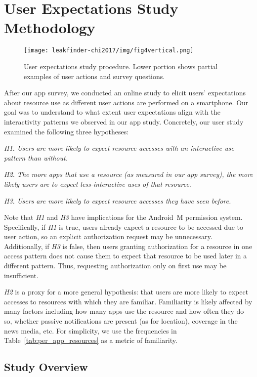 \section{User Expectations Study Methodology}

\begin{figure}[t]
\centering \texttt{[image: leakfinder-chi2017/img/fig4vertical.png]}
\caption{User expectations study procedure. Lower 
portion shows partial examples of user actions and survey questions.}
\label{fig:survey-example}
\end{figure}

After our app survey, we conducted an online study to elicit
users' expectations about resource use as different user actions are
performed on a smartphone.
 Our goal was to understand to what extent user
expectations align with the interactivity patterns we
observed in our app study. Concretely, our user study examined the following three
hypotheses:

\emph{H1. Users are more likely to expect resource accesses with an
  interactive use pattern than without.}

\emph{H2. The more apps that use a resource (as measured in our app survey), the more 
likely users are to expect less-interactive uses of that resource.}

\emph{H3. Users are more likely to expect resource accesses they
  have seen before.}

Note that \textit{H1} and \textit{H3} have implications for the Android~M
permission system. Specifically, if \emph{H1} is true, users already
expect a resource to be accessed due to user action, so an
explicit authorization request may be unnecessary. Additionally, if
\emph{H3} is false, then users granting authorization for a resource
in one access pattern does not cause them to expect that resource to
be used later in a different pattern. Thus, requesting authorization
only on first use may be insufficient.

\textit{H2} is a proxy for a more general hypothesis: that 
users are more likely to expect accesses to resources with which they
are familiar. Familiarity is likely affected by many factors including
how many apps use the resource and how often they do so, whether
passive notifications are present (as for location), coverage in the
news media, etc. For simplicity, we use the frequencies in
Table~\ref{tab:per_app_resources} as a metric of familiarity.

\subsection{Study Overview}

